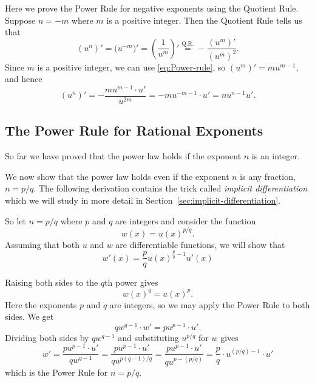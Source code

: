 Here we prove the Power Rule for negative exponents using the Quotient
Rule.  Suppose $n=-m$ where $m$ is a positive integer.   Then the Quotient
Rule tells us that
\[
(u^n)'
=\bigl(u^{-m}\bigr)'
=\left(\frac{1}{u^m}\right)'
\stackrel{\text{Q.R.}}{=}
-\frac{(u^m)'}{(u^m)^2}.
\]
Since $m$ is a positive integer, we can use \eqref{eq:Power-rule}, so
$(u^m)' = mu^{m-1}$, and hence
\[
(u^n)'
= -\frac{mu^{m-1}\cdot u'}{u^{2m}}
=-mu^{-m-1}\cdot u'
= n u^{n-1}u'.
\]








\subsection{The Power Rule for Rational Exponents} 
So far we have proved that the power law holds if the exponent $n$ is an
integer.




We now show that the power law holds even if the exponent $n$ is any
fraction, $n=p/q$.  The following derivation contains the trick called
\emph{implicit differentiation} which we will study in more detail in
Section~\ref{sec:implicit-differentiation}.




So let $n=p/q$ where $p$ and $q$ are integers and consider the function
\[
w(x)=u(x)^{p/q}.
\]
Assuming that both $u$ and $w$ are differentiable functions, we will show that
\begin{equation}\label{eq:power-rule-rational-exponents}
  w'(x) = \frac pq u(x)^{\frac pq-1}u'(x)
\end{equation}








Raising both sides to the $q$th power gives
\[
w(x)^q=u(x)^p.
\]
Here the exponents $p$ and $q$ are integers, so we may apply the Power Rule
to both sides.  We get
\[
qw^{q-1}\cdot w'=pu^{p-1}\cdot u'.
\]
Dividing both sides by $qw^{q-1}$ and substituting $u^{p/q}$ for $w$ gives
\[
w'= \frac{pu^{p-1}\cdot u'}{qw^{q-1}}=
\frac{pu^{p-1}\cdot u'}{qu^{p(q-1)/q}}=
\frac{pu^{p-1}\cdot u'}{qu^{p-(p/q)}}=
\frac{p}{q}\cdot u^{(p/q)-1}\cdot u'
\]
which is the Power Rule for $n=p/q$.








